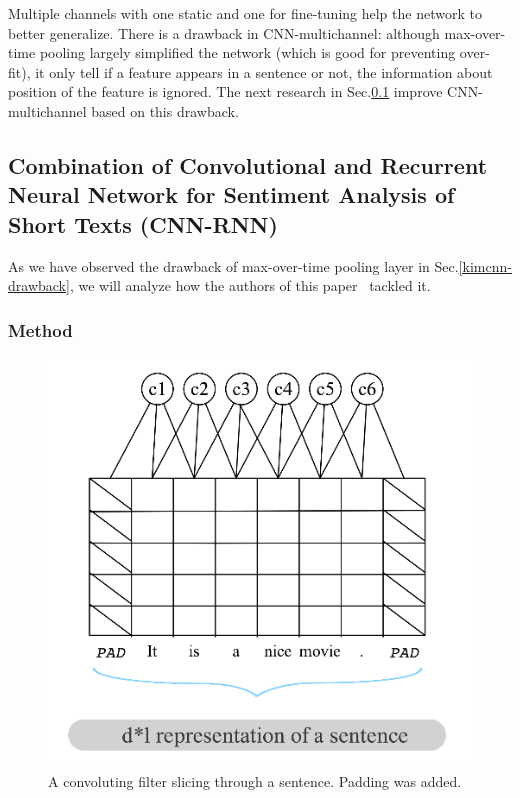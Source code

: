 Multiple channels with one static and one for fine-tuning help the network to better generalize.
There is a drawback in CNN-multichannel: although max-over-time pooling largely simplified the network (which is good for preventing over-fit), it only tell if a feature appears in a sentence or not, the information about position of the feature is ignored.\label{kim-drawback}
The next research in Sec.\ref{cnn-rnn}  improve CNN-multichannel based on this drawback.
 

\subsection{Combination of Convolutional and Recurrent Neural Network for Sentiment Analysis of Short Texts (CNN-RNN)}\label{cnn-rnn}
As we have observed the drawback of max-over-time pooling layer in Sec.\ref{kimcnn-drawback}, we will analyze how the authors of this paper~\cite{cnn-rnn} tackled it.

\subsubsection{Method}
\begin{figure}[H]
    \centering
\includegraphics[scale=0.45]{figure/conv-word}
    \caption{A convoluting filter slicing through a sentence. 
    Padding was added.}
    \label{fig:conv-word}
\end{figure}

